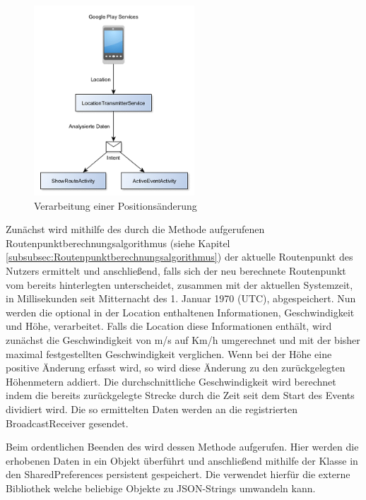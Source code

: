 \begin{figure}[htb]
\centering
\includegraphics[width=6cm]{graphics/location_update.png}
\caption{Verarbeitung einer Positionsänderung}
\label{fig:positionsaenderung}
\end{figure}

Zunächst wird mithilfe des durch die  Methode aufgerufenen Routenpunktberechnungsalgorithmus (siehe Kapitel \ref{subsubsec:Routenpunktberechnungsalgorithmus}) der aktuelle Routenpunkt des Nutzers ermittelt und anschließend, falls sich der neu berechnete Routenpunkt vom bereits hinterlegten unterscheidet, zusammen mit der aktuellen Systemzeit, in Millisekunden seit Mitternacht des 1. Januar 1970 (UTC), abgespeichert. Nun werden die optional in der Location enthaltenen Informationen, Geschwindigkeit und Höhe, verarbeitet. Falls die Location diese Informationen enthält, wird zunächst die Geschwindigkeit von m/s auf Km/h umgerechnet und mit der bisher maximal festgestellten Geschwindigkeit verglichen. Wenn bei der Höhe eine positive Änderung erfasst wird, so wird diese Änderung zu den zurückgelegten Höhenmetern addiert. Die durchschnittliche Geschwindigkeit wird berechnet indem die bereits zurückgelegte Strecke durch die Zeit seit dem Start des Events dividiert wird. Die so ermittelten Daten werden an die registrierten BroadcastReceiver gesendet.

Beim ordentlichen Beenden des  wird dessen  Methode aufgerufen. Hier werden die erhobenen Daten in ein  Objekt überführt und anschließend mithilfe der  Klasse in den SharedPreferences persistent gespeichert. Die  verwendet hierfür die externe Bibliothek  welche beliebige Objekte zu JSON-Strings umwandeln kann.

